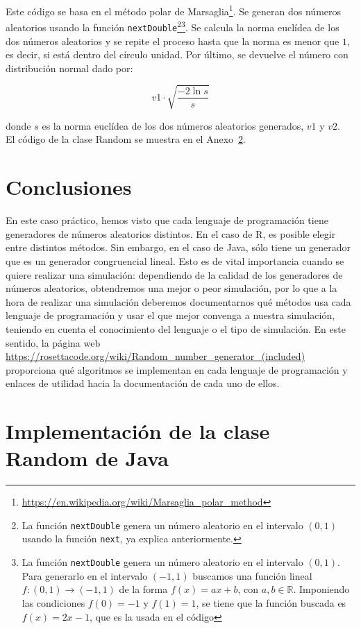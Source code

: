\documentclass[12pt,a4paper,twoside,openright,titlepage,final]{article}
\begin{document}
Este código se basa en el método polar de Marsaglia\footnote{\url{https://en.wikipedia.org/wiki/Marsaglia_polar_method}}. Se generan dos números aleatorios usando la función \texttt{nextDouble}\footnote{La función \texttt{nextDouble} genera un número aleatorio en el intervalo $(0,1)$ usando la función \texttt{next}, ya explica anteriormente.}\footnote{La función \texttt{nextDouble} genera un número aleatorio en el intervalo $(0,1)$. Para generarlo en el intervalo $(-1,1)$ buscamos una función lineal $f: (0,1) \to (-1,1)$ de la forma $f(x) = ax + b$, con $a,b \in \mathbb{R}$. Imponiendo las condiciones $f(0)= -1$ y $f(1) = 1$, se tiene que la función buscada es $f(x) = 2x-1$, que es la usada en el código}. Se calcula la norma euclídea de los dos números aleatorios y se repite el proceso hasta que la norma es menor que $1$, es decir, si está dentro del círculo unidad. Por último, se devuelve el número con distribución normal dado por:

\[ v1 \cdot \sqrt{\dfrac{-2 \ln s}{s}} \]

donde $s$ es la norma euclídea de los dos números aleatorios generados, $v1$ y $v2$.\\

El código de la clase Random se muestra en el Anexo~\ref{app:Random}.

\section{Conclusiones}

En este caso práctico, hemos visto que cada lenguaje de programación tiene generadores de números aleatorios distintos. En el caso de R, es posible elegir entre distintos métodos. Sin embargo, en el caso de Java, sólo tiene un generador que es un generador congruencial lineal. Esto es de vital importancia cuando se quiere realizar una simulación: dependiendo de la calidad de los generadores de números aleatorios, obtendremos una mejor o peor simulación, por lo que a la hora de realizar una simulación deberemos documentarnos qué métodos usa cada lenguaje de programación y usar el que mejor convenga a nuestra simulación, teniendo en cuenta el conocimiento del lenguaje o el tipo de simulación. En este sentido, la página web \url{https://rosettacode.org/wiki/Random_number_generator_(included)} proporciona qué algoritmos se implementan en cada lenguaje de programación y enlaces de utilidad hacia la documentación de cada uno de ellos.  

\newpage
\appendix
\section{Implementación de la clase Random de Java}\label{app:Random}
\end{document}
